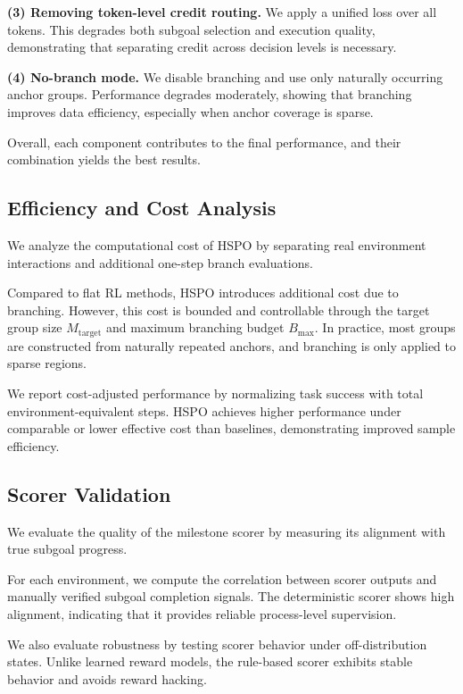 \documentclass{article}
\begin{document}
\textbf{(3) Removing token-level credit routing.}
We apply a unified loss over all tokens. This degrades both subgoal selection and execution quality, demonstrating that separating credit across decision levels is necessary.

\textbf{(4) No-branch mode.}
We disable branching and use only naturally occurring anchor groups. Performance degrades moderately, showing that branching improves data efficiency, especially when anchor coverage is sparse.

Overall, each component contributes to the final performance, and their combination yields the best results.

\subsection{Efficiency and Cost Analysis}
\label{sec:efficiency}

We analyze the computational cost of HSPO by separating real environment interactions and additional one-step branch evaluations.

Compared to flat RL methods, HSPO introduces additional cost due to branching. However, this cost is bounded and controllable through the target group size $M_{\mathrm{target}}$ and maximum branching budget $B_{\max}$. In practice, most groups are constructed from naturally repeated anchors, and branching is only applied to sparse regions.

We report cost-adjusted performance by normalizing task success with total environment-equivalent steps. HSPO achieves higher performance under comparable or lower effective cost than baselines, demonstrating improved sample efficiency.

\subsection{Scorer Validation}
\label{sec:scorer}

We evaluate the quality of the milestone scorer by measuring its alignment with true subgoal progress.

For each environment, we compute the correlation between scorer outputs and manually verified subgoal completion signals. The deterministic scorer shows high alignment, indicating that it provides reliable process-level supervision.

We also evaluate robustness by testing scorer behavior under off-distribution states. Unlike learned reward models, the rule-based scorer exhibits stable behavior and avoids reward hacking.
\end{document}
